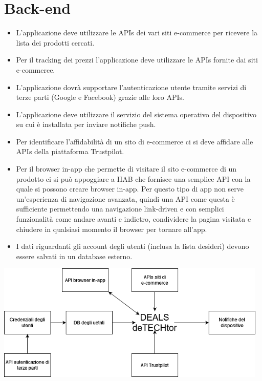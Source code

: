 \documentclass{article}
\begin{document}
\section{Back-end}
\begin{itemize}
    \item L’applicazione deve utilizzare le APIs dei vari siti e-commerce per ricevere la lista dei prodotti cercati.
    \item {\color{red}Per il tracking dei prezzi l'applicazione deve utilizzare le APIs fornite dai siti e-commerce}. 
    \item L'applicazione dovrà supportare l’autenticazione utente tramite servizi di terze parti (Google e Facebook) grazie alle loro APIs.
    \item L’applicazione deve utilizzare il servizio del sistema operativo del dispositivo su cui è installata per inviare notifiche push.
    \item Per identificare l’affidabilità di un sito di e-commerce ci si deve affidare alle APIs della piattaforma Trustpilot.
    \item Per il browser in-app che permette di visitare il sito e-commerce di un prodotto ci si può appoggiare a IIAB che fornisce una
            semplice API con la quale si possono creare browser in-app. Per questo tipo di app non serve un’esperienza di navigazione avanzata,
            quindi una API come questa è sufficiente permettendo una navigazione link-driven e con semplici funzionalità come andare avanti e
            indietro, condividere la pagina visitata e chiudere in qualsiasi momento il browser per tornare all’app.
    \item {\color{red}I dati riguardanti gli account degli utenti (inclusa la lista desideri) devono essere salvati in un database esterno.}
\end{itemize}
\begin{center}
        \includegraphics[width=130mm]{diagramma.png}
\end{center}
\end{document}
